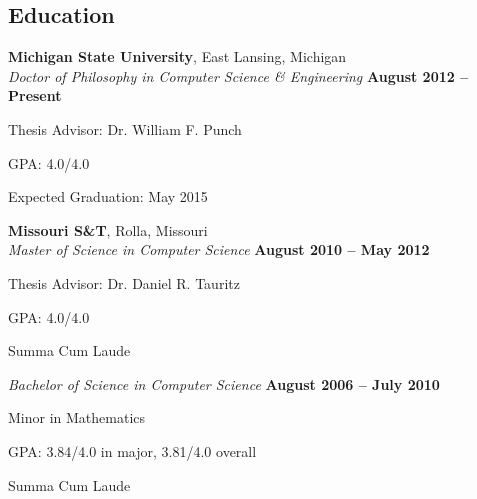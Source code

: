 \documentclass[margin,line]{resume}
\begin{document}
\begin{resume}
    \section{\mysidestyle Education}
    \textbf{Michigan State University}, East Lansing, Michigan \vspace{2mm}\\\vspace{1mm}%
    \textsl{Doctor of Philosophy in Computer Science \& Engineering} \hfill \textbf{ August 2012 -- Present}\vspace{-3mm}\\\vspace{-1mm}%
    \begin{list2}
        \item Thesis Advisor:  Dr. William F. Punch
        \item GPA: 4.0/4.0
        \item Expected Graduation: May 2015
    \end{list2}\vspace{-1.5mm}
    \textbf{Missouri S\&T}, Rolla, Missouri \vspace{2mm}\\\vspace{1mm}%
    \textsl{Master of Science in Computer Science} \hfill \textbf{ August 2010 -- May 2012}\vspace{-3mm}\\\vspace{-1mm}%
    \begin{list2}
        \item Thesis Advisor:  Dr. Daniel R. Tauritz
        \item GPA: 4.0/4.0
        \item Summa Cum Laude
    \end{list2}\vspace{-1.5mm}
    \textsl{Bachelor of Science in Computer Science} \hfill \textbf{ August 2006 -- July 2010}\vspace{-3mm}\\\vspace{-1mm}%
    \begin{list2}
        \item Minor in Mathematics
        \item GPA: 3.84/4.0 in major, 3.81/4.0 overall
        \item Summa Cum Laude
    \end{list2}\vspace{-1.5mm}




\end{resume}
\end{document}

